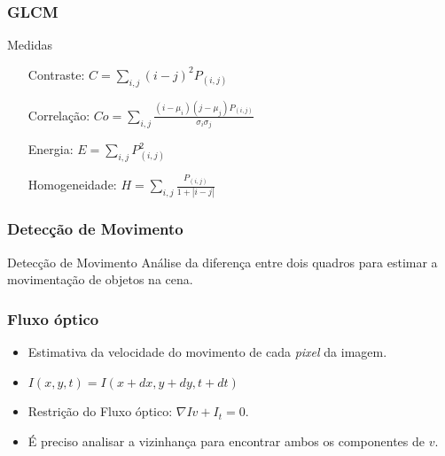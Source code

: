 \documentclass{beamer}
\begin{document}
\begin{frame}
\frametitle{GLCM}
\begin{block}{Medidas}
\begin{itemize}
\centering
\item[Contraste:] $C = \sum_{i,j} (i-j)^{2}P_{(i,j)}$
\item[Correlação:] $Co = \sum_{i,j} \frac{(i - \mu_i)(j - \mu_j)P_{(i,j)}}{\sigma_i\sigma_j}$
\item[Energia:]$E = \sum_{i,j} P_{(i,j)}^{2}$
\item[Homogeneidade:]$H = \sum_{i,j} \frac{P_{(i,j)}}{1+|i-j|}$
\centering
\end{itemize}
\end{block}
\end{frame}

\begin{frame}
\frametitle{Detecção de Movimento}
\begin{block}{Detecção de Movimento}
Análise da diferença entre dois quadros para estimar a movimentação de objetos na cena.
\end{block}
\end{frame}

\begin{frame}
\frametitle{Fluxo óptico}
\begin{itemize}
\item Estimativa da velocidade do movimento de cada \textit{pixel} da imagem.
\item $I(x,y,t) = I(x+dx, y+dy, t+dt)$
\item Restrição do Fluxo óptico: $\nabla Iv + I_t = 0$.
\item É preciso analisar a vizinhança para encontrar ambos os componentes de $v$.
\end{itemize}
\end{frame}
\end{document}
